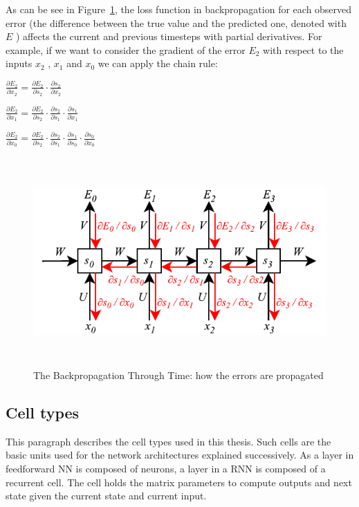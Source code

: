 As can be see in Figure~\ref{fig:bptt}, the loss function in backpropagation for each observed error (the difference between the true value and the predicted one, denoted with  \( E \) ) affects the current and previous timesteps with partial derivatives. For example, if we want to consider the gradient of the error  \( E_{2} \) with respect to the inputs  \( x_{2} \) ,  \( x_{1} \) and  \( x_{0} \)  we can apply the chain rule:

 \(  \frac{ \partial E_{2}}{ \partial x_{2}}=\frac{ \partial E_{2}}{ \partial s_{2}}\cdot \frac{ \partial s_{2}}{ \partial x_{2}} \) 

 \(  \frac{ \partial E_{2}}{ \partial x_{1}}=\frac{ \partial E_{2}}{ \partial s_{2}}\cdot \frac{ \partial s_{2}}{ \partial s_{1}}\cdot \frac{ \partial s_{1}}{ \partial x_{1}} \) 

 \(  \frac{ \partial E_{2}}{ \partial x_{0}}=\frac{ \partial E_{2}}{ \partial s_{2}}\cdot \frac{ \partial s_{2}}{ \partial s_{1}}\cdot \frac{ \partial s_{1}}{ \partial s_{0}}\cdot \frac{ \partial s_{0}}{ \partial x_{0}} \) 


\begin{figure}[!htbp]
    \centering
    \includegraphics[max width=\linewidth,max height=8cm,keepaspectratio]{figures/bptt}
    \caption{The Backpropagation Through Time: how the errors are propagated}\label{fig:bptt}
\end{figure}

\subsection{Cell types}
This paragraph describes the  cell types used in this thesis. Such cells are the basic units used for the network architectures explained successively. As a layer in feedforward NN is composed of neurons, a layer in a RNN is composed of a recurrent cell. The cell holds the matrix parameters to compute outputs and next state given the current state and current input.

